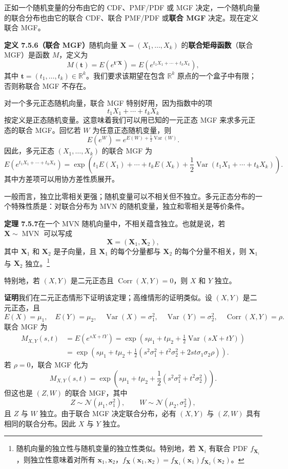 \documentclass[UTF8, 12pt, fontset=fandol, oneside]{ctexart}
\begin{document}
正如一个随机变量的分布由它的 CDF、PMF/PDF 或 MGF 决定，一个随机向量的联合分布也由它的联合 CDF、联合 PMF/PDF 或\textbf{联合 MGF} 决定。现在定义联合 MGF。

\noindent\textbf{定义 7.5.6（联合 MGF）}\quad 随机向量 $\mathbf{X}=(X_1,\ldots,X_k)$ 的\textbf{联合矩母函数}（联合 MGF）是函数 $M$，定义为
\[
  M(\mathbf{t})=E(e^{\mathbf{t}'\mathbf{X}})
  =E\left(e^{t_1X_1+\cdots+t_kX_k}\right),
\]
其中 $\mathbf{t}=(t_1,\ldots,t_k)\in \mathbb{R}^k$。我们要求该期望在包含 $\mathbb{R}^k$ 原点的一个盒子中有限；否则称联合 MGF 不存在。

对一个多元正态随机向量，联合 MGF 特别好用，因为指数中的项
\[
  t_1X_1+\cdots+t_kX_k
\]
按定义是正态随机变量。这意味着我们可以用已知的一元正态 MGF 来求多元正态的联合 MGF。回忆若 $W$ 为任意正态随机变量，则
\[
  E(e^W)=e^{E(W)+\frac12\operatorname{Var}(W)}.
\]
因此，多元正态 $(X_1,\ldots,X_k)$ 的联合 MGF 为
\[
  E\left(e^{t_1X_1+\cdots+t_kX_k}\right)
  =\exp\left(t_1E(X_1)+\cdots+t_kE(X_k)
  +\frac12\operatorname{Var}(t_1X_1+\cdots+t_kX_k)\right).
\]
其中方差项可以用协方差性质展开。

一般而言，独立比零相关更强；随机变量可以不相关但不独立。多元正态分布的一个特殊性质是：对联合分布为 MVN 的随机变量，独立和零相关是等价条件。

\noindent\textbf{定理 7.5.7}\quad 在一个 MVN 随机向量中，不相关蕴含独立。也就是说，若 $\mathbf{X}\sim \operatorname{MVN}$ 可以写成
\[
  \mathbf{X}=(\mathbf{X}_1,\mathbf{X}_2),
\]
其中 $\mathbf{X}_1$ 和 $\mathbf{X}_2$ 是子向量，且 $\mathbf{X}_1$ 的每个分量都与 $\mathbf{X}_2$ 的每个分量不相关，则 $\mathbf{X}_1$ 与 $\mathbf{X}_2$ 独立。\footnote{随机向量的独立性与随机变量的独立性类似。特别地，若 $\mathbf{X}_i$ 有联合 PDF $f_{\mathbf{X}_i}$，则独立性意味着对所有 $\mathbf{x}_1,\mathbf{x}_2$，$f_{\mathbf{X}}(\mathbf{x}_1,\mathbf{x}_2)=f_{\mathbf{X}_1}(\mathbf{x}_1)f_{\mathbf{X}_2}(\mathbf{x}_2)$。}

特别地，若 $(X,Y)$ 是二元正态且 $\operatorname{Corr}(X,Y)=0$，则 $X$ 和 $Y$ 独立。

\noindent\textbf{证明}\quad 我们在二元正态情形下证明该定理；高维情形的证明类似。设 $(X,Y)$ 是二元正态，且
\[
  E(X)=\mu_1,\quad E(Y)=\mu_2,\quad
  \operatorname{Var}(X)=\sigma_1^2,\quad
  \operatorname{Var}(Y)=\sigma_2^2,\quad
  \operatorname{Corr}(X,Y)=\rho.
\]
联合 MGF 为
\[
\begin{aligned}
  M_{X,Y}(s,t)
  &=E(e^{sX+tY})
  =\exp\left(s\mu_1+t\mu_2+\frac12\operatorname{Var}(sX+tY)\right)\\
  &=\exp\left(s\mu_1+t\mu_2
  +\frac12(s^2\sigma_1^2+t^2\sigma_2^2+2st\sigma_1\sigma_2\rho)\right).
\end{aligned}
\]
若 $\rho=0$，联合 MGF 化为
\[
  M_{X,Y}(s,t)
  =\exp\left(s\mu_1+t\mu_2+\frac12(s^2\sigma_1^2+t^2\sigma_2^2)\right).
\]
但这也是 $(Z,W)$ 的联合 MGF，其中
\[
  Z\sim \mathcal{N}(\mu_1,\sigma_1^2),\qquad
  W\sim \mathcal{N}(\mu_2,\sigma_2^2),
\]
且 $Z$ 与 $W$ 独立。由于联合 MGF 决定联合分布，必有 $(X,Y)$ 与 $(Z,W)$ 具有相同的联合分布。因此 $X$ 与 $Y$ 独立。
\end{document}

